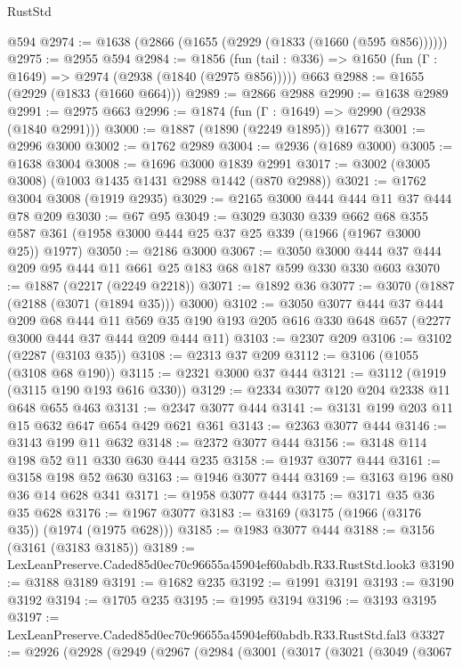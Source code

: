 \begin{lexlean}{RustStd}
\begin{coremodule}
    @594
@2974 := @1638 (@2866 (@1655 (@2929 (@1833 (@1660 (@595 @856))))))
@2975 := @2955 @594
@2984 := @1856
    (fun (tail : @336) => @1650 (fun (Γ : @1649) => @2974 (@2938 (@1840 (@2975 @856)))))
    @663
@2988 := @1655 (@2929 (@1833 (@1660 @664)))
@2989 := @2866 @2988
@2990 := @1638 @2989
@2991 := @2975 @663
@2996 := @1874 (fun (Γ : @1649) => @2990 (@2938 (@1840 @2991)))
@3000 := @1887 (@1890 (@2249 @1895)) @1677
@3001 := @2996 @3000
@3002 := @1762 @2989
@3004 := @2936 (@1689 @3000)
@3005 := @1638 @3004
@3008 := @1696 @3000 @1839 @2991
@3017 := @3002 (@3005 @3008) (@1003 @1435 @1431 @2988 @1442 (@870 @2988))
@3021 := @1762 @3004 @3008 (@1919 @2935)
@3029 := @2165 @3000 @444 @444 @11 @37 @444 @78 @209
@3030 := @67 @95
@3049 := @3029
    @3030
    @339
    @662
    @68
    @355
    @587
    @361
    (@1958 @3000 @444 @25 @37 @25 @339 (@1966 (@1967 @3000 @25)) @1977)
@3050 := @2186 @3000
@3067 := @3050 @3000 @444 @37 @444 @209 @95 @444 @11 @661 @25 @183 @68 @187 @599 @330 @330 @603
@3070 := @1887 (@2217 (@2249 @2218))
@3071 := @1892 @36
@3077 := @3070 (@1887 (@2188 (@3071 (@1894 @35))) @3000)
@3102 := @3050
    @3077
    @444
    @37
    @444
    @209
    @68
    @444
    @11
    @569
    @35
    @190
    @193
    @205
    @616
    @330
    @648
    @657
    (@2277 @3000 @444 @37 @444 @209 @444 @11)
@3103 := @2307 @209
@3106 := @3102 (@2287 (@3103 @35))
@3108 := @2313 @37 @209
@3112 := @3106 (@1055 (@3108 @68 @190))
@3115 := @2321 @3000 @37 @444
@3121 := @3112 (@1919 (@3115 @190 @193 @616 @330))
@3129 := @2334 @3077 @120 @204 @2338 @11 @648 @655 @463
@3131 := @2347 @3077 @444
@3141 := @3131 @199 @203 @11 @15 @632 @647 @654 @429 @621 @361
@3143 := @2363 @3077 @444
@3146 := @3143 @199 @11 @632
@3148 := @2372 @3077 @444
@3156 := @3148 @114 @198 @52 @11 @330 @630 @444 @235
@3158 := @1937 @3077 @444
@3161 := @3158 @198 @52 @630
@3163 := @1946 @3077 @444
@3169 := @3163 @196 @80 @36 @14 @628 @341
@3171 := @1958 @3077 @444
@3175 := @3171 @35 @36 @35 @628
@3176 := @1967 @3077
@3183 := @3169 (@3175 (@1966 (@3176 @35)) (@1974 (@1975 @628)))
@3185 := @1983 @3077 @444
@3188 := @3156 (@3161 (@3183 @3185))
@3189 := LexLeanPreserve.Caded85d0ec70c96655a45904ef60abdb.R33.RustStd.look3
@3190 := @3188 @3189
@3191 := @1682 @235
@3192 := @1991 @3191
@3193 := @3190 @3192
@3194 := @1705 @235
@3195 := @1995 @3194
@3196 := @3193 @3195
@3197 := LexLeanPreserve.Caded85d0ec70c96655a45904ef60abdb.R33.RustStd.fal3
@3327 := @2926
    (@2928
      (@2949
        (@2967
          (@2984
            (@3001
              (@3017
                (@3021
                  (@3049
                    (@3067

\end{coremodule}
\end{lexlean}
